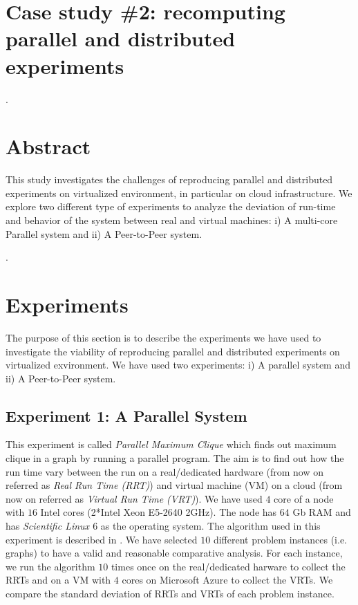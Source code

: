 \section{Case study \#2: recomputing parallel and distributed experiments}
\label{s:group2}

.\section*{Abstract}
This study investigates the challenges of reproducing parallel and distributed experiments on virtualized environment, in particular on cloud infrastructure. We explore two different type of experiments to analyze the deviation of run-time and behavior of the system between real and virtual machines: i) A multi-core Parallel system and ii) A Peer-to-Peer system.

.\section*{Experiments}
\label{sec:experiments}
The purpose of this section is to describe the experiments we have used to investigate the viability of reproducing parallel and distributed experiments on virtualized exvironment. We have used two experiments: i) A parallel system and ii) A Peer-to-Peer system.

\subsection*{Experiment 1: A Parallel System}
This experiment is called \emph{Parallel Maximum Clique} which finds out maximum clique in a graph by running a parallel program. The aim is to find out how the run time vary between the run on a real/dedicated hardware (from now on referred as \emph{Real Run Time (RRT)}) and virtual machine (VM) on a cloud (from now on referred as \emph{Virtual Run Time (VRT)}). We have used $4$ core of a node with $16$ Intel cores (2*Intel Xeon E5-2640 2GHz). The node has $64$ Gb RAM and has \emph{Scientific Linux $6$} as the operating system. The algorithm used in this experiment is described in \cite{ciaran}. We have selected $10$ different problem instances (i.e. graphs) to have a valid and reasonable comparative analysis. For each instance, we run the algorithm $10$ times once on the real/dedicated harware to collect the RRTs and on a VM with $4$ cores on Microsoft Azure \cite{azure} to collect the VRTs. We compare the standard deviation of RRTs and VRTs of each problem instance. 

